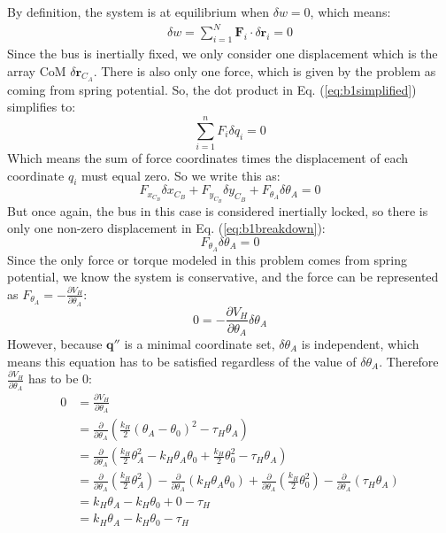 \documentclass[titlepage]{article}
\begin{document}
By definition, the system is at equilibrium when $\delta w=0$, which means:
\begin{equation}
	\begin{split}
		\delta w= \sum_{i=1}^{N}\boldsymbol{F}_i\cdot\delta\boldsymbol{r}_i=0
	\end{split}
	\label{eq:b1simplified}
\end{equation}
Since the bus is inertially fixed, we only consider one displacement which is the array CoM $\delta\boldsymbol{r}_{C_A}$. There is also only one force, which is given by the problem as coming from spring potential. So, the dot product in Eq. (\ref{eq:b1simplified}) simplifies to:
\begin{equation}
	\sum_{i=1}^{n}F_i\delta q_i = 0
\end{equation}
Which means the sum of force coordinates times the displacement of each coordinate $q_i$ must equal zero. So we write this as:
\begin{equation}
	F_{x_{C_B}}\delta x_{C_B}+F_{y_{C_B}}\delta y_{C_B}+F_{\theta_A}\delta\theta_A=0
	\label{eq:b1breakdown}
\end{equation}
But once again, the bus in this case is considered inertially locked, so there is only one non-zero displacement in Eq. (\ref{eq:b1breakdown}):
\begin{equation}
	F_{\theta_A}\delta\theta_A=0
\end{equation}
Since the only force or torque modeled in this problem comes from spring potential, we know the system is conservative, and the force can be represented as $F_{\theta_A}=-\frac{\partial V_H}{\partial\theta_A}$:
\begin{equation}
	0=-\frac{\partial V_H}{\partial\theta_A}\delta\theta_A 
\end{equation}
However, because $\boldsymbol{q}''$ is a minimal coordinate set, $\delta\theta_A$ is independent, which means this equation has to be satisfied regardless of the value of $\delta\theta_A$. Therefore $\frac{\partial V_H}{\partial\theta_A}$ has to be 0:
\begin{equation}
	\begin{split}
		0&=\frac{\partial V_H}{\partial\theta_A} \\
		&=\frac{\partial}{\partial\theta_A}\left(\frac{k_H}{2}(\theta_A-\theta_0)^2-\tau_H\theta_A\right) \\
		&=\frac{\partial}{\partial\theta_A}\left(\frac{k_H}{2}\theta_A^2-k_H\theta_A\theta_0+\frac{k_H}{2}\theta_0^2-\tau_H\theta_A\right) \\
		&=\frac{\partial}{\partial\theta_A}\left(\frac{k_H}{2}\theta_A^2\right)-\frac{\partial}{\partial\theta_A}\left(k_H\theta_A\theta_0\right)+\frac{\partial}{\partial\theta_A}\left(\frac{k_H}{2}\theta_0^2\right)-\frac{\partial}{\partial\theta_A}\left(\tau_H\theta_A\right) \\
		&=k_H\theta_A-k_H\theta_0+0-\tau_H \\
		&=k_H\theta_A-k_H\theta_0-\tau_H
	\end{split}
\end{equation}
\end{document}
